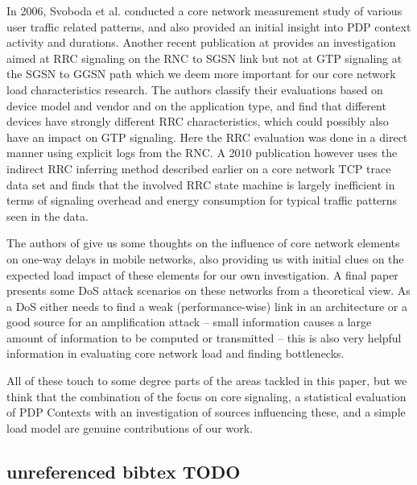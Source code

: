 In 2006, Svoboda et al. \cite{svoboda2006composition} conducted a core network measurement study of various user traffic related patterns, and also provided an initial insight into \gls{PDP} context activity and durations. Another recent publication at \cite{he2012panoramic} provides an investigation aimed at \gls{RRC} signaling on the \gls{RNC} to \gls{SGSN} link but not at \gls{GTP} signaling at the \gls{SGSN} to \gls{GGSN} path which we deem more important for our core network load characteristics research. The authors classify their evaluations based on device model and vendor and on the application type, and find that different devices have strongly different \gls{RRC} characteristics, which could possibly also have an impact on \gls{GTP} signaling. Here the \gls{RRC} evaluation was done in a direct manner using explicit logs from the \gls{RNC}. A 2010 publication\cite{Qian:2010:CRR:1879141.1879159} however uses the indirect \gls{RRC} inferring method described earlier on a core network TCP trace data set and finds that the involved \gls{RRC} state machine is largely inefficient in terms of signaling overhead and energy consumption for typical traffic patterns seen in the data.

The authors of \cite{4675847} give us some thoughts on the influence of core network elements on one-way delays in mobile networks, also providing us with initial clues on the expected load impact of these elements for our own investigation. A final paper \cite{Ricciato2010551} presents some \gls{DoS} attack scenarios on these networks from a theoretical view. As a \gls{DoS} either needs to find a weak (performance-wise) link in an architecture or a good source for an amplification attack -- small information causes a large amount of information to be computed or transmitted -- this is also very helpful information in evaluating core network load and finding bottlenecks.

All of these touch to some degree parts of the areas tackled in this paper, but we think that the combination of the focus on core signaling, a statistical evaluation of PDP Contexts with an investigation of sources influencing these, and a simple load model are genuine contributions of our work.



\subsection{unreferenced bibtex TODO}

